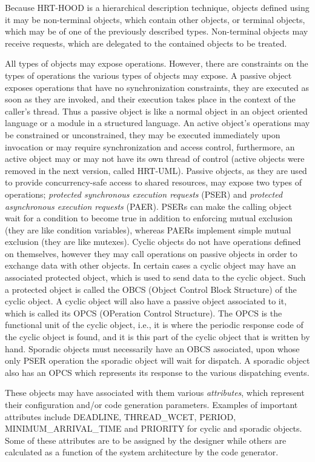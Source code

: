 Because HRT-HOOD is a hierarchical description technique, objects
defined using it may be non-terminal objects, which contain other
objects, or terminal objects, which may be of one of the previously
described types. Non-terminal objects may receive requests, which are
delegated to the contained objects to be treated.

All types of objects may expose operations. However, there are
constraints on the types of operations the various types of objects
may expose. A passive object exposes operations that have no
synchronization constraints, they are executed as soon as they are
invoked, and their execution takes place in the context of the
caller's thread. Thus a passive object is like a normal object in an
object oriented language or a module in a structured language. An
active object's operations may be constrained or unconstrained, they
may be executed immediately upon invocation or may require
synchronization and access control, furthermore, an active object may
or may not have its own thread of control (active objects were removed
in the next version, called HRT-UML). Passive objects, as they are
used to provide concurrency-safe access to shared resources, may
expose two types of operations; \emph{protected synchronous execution
  requests} (PSER) and \emph{protected asynchronous execution
  requests} (PAER). PSERs can make the calling object wait for a
condition to become true in addition to enforcing mutual exclusion
(they are like condition variables), whereas PAERs implement simple
mutual exclusion (they are like mutexes). Cyclic objects do not have
operations defined on themselves, however they may call operations on
passive objects in order to exchange data with other objects. In
certain cases a cyclic object may have an associated protected object,
which is used to send data to the cyclic object. Such a protected
object is called the OBCS (Object Control Block Structure) of the
cyclic object. A cyclic object will also have a passive object
associated to it, which is called its OPCS (OPeration Control
Structure). The OPCS is the functional unit of the cyclic object,
i.e., it is where the periodic response code of the cyclic object is
found, and it is this part of the cyclic object that is written by
hand. Sporadic objects must necessarily have an OBCS associated, upon
whose only PSER operation the sporadic object will wait for
dispatch. A sporadic object also has an OPCS which represents its
response to the various dispatching events.

These objects may have associated with them various \emph{attributes},
which represent their configuration and/or code generation
parameters. Examples of important attributes include DEADLINE,
THREAD\_WCET, PERIOD, MINIMUM\_ARRIVAL\_TIME and PRIORITY for cyclic
and sporadic objects. Some of these attributes are to be assigned by
the designer while others are calculated as a function of the system
architecture by the code generator.


